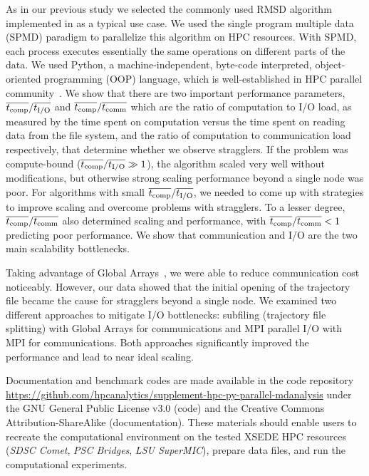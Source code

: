 As in our previous study we selected the commonly used RMSD algorithm implemented in  as a typical use case.
We used the single program multiple data (SPMD) paradigm to parallelize this algorithm on HPC resources.
With SPMD, each process executes essentially the same operations on different parts of the data. 
We used Python, a machine-independent, byte-code interpreted, object-oriented programming (OOP) language, which is well-established in HPC parallel community~\cite{GAiN}. 
We show that there are two important performance parameters, $\overline{{t}_{\text{comp}}}/\overline{{t}_{\text{I/O}}}$ and $\overline{{t}_{\text{comp}}}/\overline{t_{\text{comm}}}$ which are the ratio of computation to I/O load, as measured by the time spent on computation versus the time spent on reading data from the file system, and the ratio of computation to communication load respectively, that determine whether we observe stragglers.
If the problem was compute-bound ($\overline{{t}_{\text{comp}}}/\overline{{t}_{\text{I/O}}} \gg 1$), the algorithm scaled very well without modifications, but otherwise strong scaling performance beyond a single node was poor.  
For algorithms with small $\overline{{t}_{\text{comp}}}/\overline{{t}_{\text{I/O}}}$, we needed to come up with strategies to improve scaling and overcome problems with stragglers.
To a lesser degree, $\overline{{t}_{\text{comp}}}/\overline{t_{\text{comm}}}$ also determined scaling and performance, with $\overline{{t}_{\text{comp}}}/\overline{t_{\text{comm}}} < 1$ predicting poor performance.
We show that communication and I/O are the two main scalability bottlenecks.

Taking advantage of Global Arrays~\cite{GA, GAiN}, we were able to reduce communication cost noticeably.
However, our data showed that the initial opening of the trajectory file became the cause for stragglers beyond a single node.
We examined two different approaches to mitigate I/O bottlenecks: subfiling (trajectory file splitting) with Global Arrays for communications and MPI parallel I/O with MPI for communications.
Both approaches significantly improved the performance and lead to near ideal scaling.

Documentation and benchmark codes are made available in the code repository \url{https://github.com/hpcanalytics/supplement-hpc-py-parallel-mdanalysis} under the GNU General Public License v3.0 (code) and the Creative Commons Attribution-ShareAlike (documentation). 
These materials should enable users to recreate the computational environment on the tested XSEDE HPC resources (\emph{SDSC Comet}, \emph{PSC Bridges}, \emph{LSU SuperMIC}), prepare data files, and run the computational experiments.
